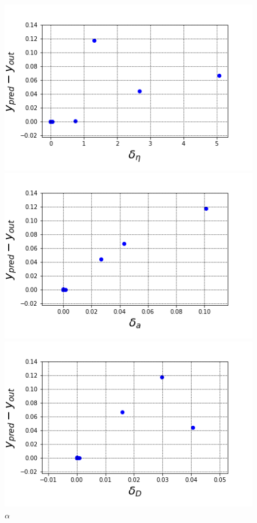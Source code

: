 \documentclass[16.7pt]{jsarticle}
\begin{document}
		\begin{figure}[h]
			\centering
			\begin{minipage}{0.45\hsize}
				\centering
				\includegraphics[width= 0.85\columnwidth]{./figure/delta_OmgEta.png}
				\caption{$ \omega_{\eta} $}
			\end{minipage}
			\begin{minipage}{0.45\hsize}
				\centering
				\includegraphics[width= 0.85\columnwidth]{./figure/delta_Alpha.png}
				\caption{$ \alpha $}
			\end{minipage}
			\begin{minipage}{0.45\hsize}
				\centering
				\includegraphics[width= 0.85\columnwidth]{./figure/delta_Dist.png}

\end{minipage}
\end{figure}
\end{document}
